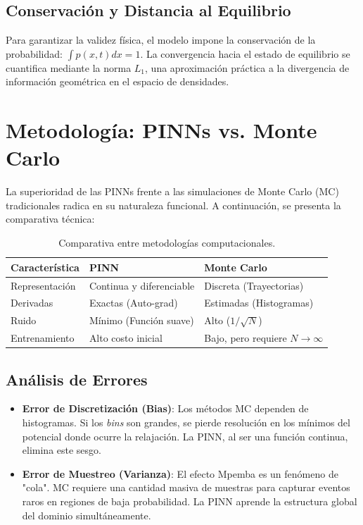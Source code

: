 \documentclass[a4paper,12pt]{article}
\begin{document}
\subsection{Conservación y Distancia al Equilibrio}
Para garantizar la validez física, el modelo impone la conservación de la probabilidad: $\int p(x,t) dx = 1$. La convergencia hacia el estado de equilibrio se cuantifica mediante la norma $L_1$, una aproximación práctica a la divergencia de información geométrica en el espacio de densidades.

\section{Metodología: PINNs vs. Monte Carlo}
La superioridad de las PINNs frente a las simulaciones de Monte Carlo (MC) tradicionales radica en su naturaleza funcional. A continuación, se presenta la comparativa técnica:

\begin{table}[H]
\centering
\begin{tabular}{lll}
\toprule
\textbf{Característica} & \textbf{PINN} & \textbf{Monte Carlo} \\
\midrule
Representación & Continua y diferenciable & Discreta (Trayectorias) \\
Derivadas & Exactas (Auto-grad) & Estimadas (Histogramas) \\
Ruido & Mínimo (Función suave) & Alto ($1/\sqrt{N}$) \\
Entrenamiento & Alto costo inicial & Bajo, pero requiere $N \to \infty$ \\
\bottomrule
\end{tabular}
\caption{Comparativa entre metodologías computacionales.}
\end{table}

\subsection{Análisis de Errores}
\begin{itemize}
    \item \textbf{Error de Discretización (Bias)}: Los métodos MC dependen de histogramas. Si los \textit{bins} son grandes, se pierde resolución en los mínimos del potencial donde ocurre la relajación. La PINN, al ser una función continua, elimina este sesgo.
    \item \textbf{Error de Muestreo (Varianza)}: El efecto Mpemba es un fenómeno de "cola". MC requiere una cantidad masiva de muestras para capturar eventos raros en regiones de baja probabilidad. La PINN aprende la estructura global del dominio simultáneamente.
\end{itemize}
\end{document}
